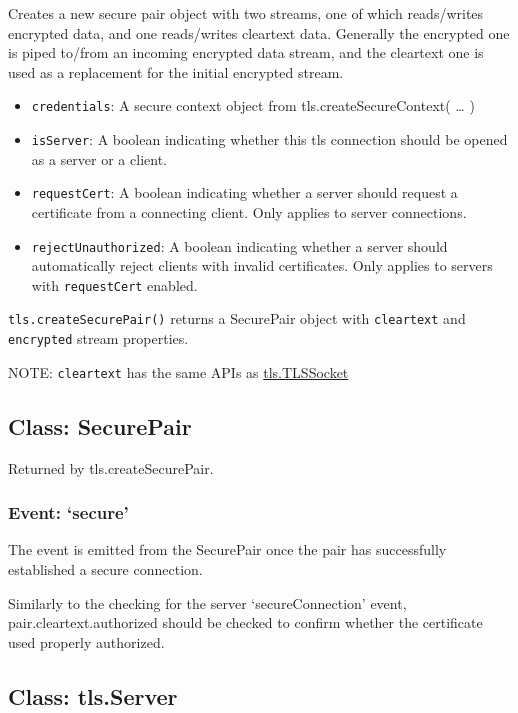 Creates a new secure pair object with two streams, one of which
reads/writes encrypted data, and one reads/writes cleartext data.
Generally the encrypted one is piped to/from an incoming encrypted data
stream, and the cleartext one is used as a replacement for the initial
encrypted stream.

\begin{itemize}
\item
  \texttt{credentials}: A secure context object from
  tls.createSecureContext( \ldots{} )
\item
  \texttt{isServer}: A boolean indicating whether this tls connection
  should be opened as a server or a client.
\item
  \texttt{requestCert}: A boolean indicating whether a server should
  request a certificate from a connecting client. Only applies to server
  connections.
\item
  \texttt{rejectUnauthorized}: A boolean indicating whether a server
  should automatically reject clients with invalid certificates. Only
  applies to servers with \texttt{requestCert} enabled.
\end{itemize}

\texttt{tls.createSecurePair()} returns a SecurePair object with
\texttt{cleartext} and \texttt{encrypted} stream properties.

NOTE: \texttt{cleartext} has the same APIs as
\hyperref[tlsux5fclassux5ftlsux5ftlssocket]{tls.TLSSocket}

\subsection{Class: SecurePair}\label{class-securepair}

Returned by tls.createSecurePair.

\subsubsection{Event: `secure'}\label{event-secure}

The event is emitted from the SecurePair once the pair has successfully
established a secure connection.

Similarly to the checking for the server `secureConnection' event,
pair.cleartext.authorized should be checked to confirm whether the
certificate used properly authorized.

\subsection{Class: tls.Server}\label{class-tls.server}

